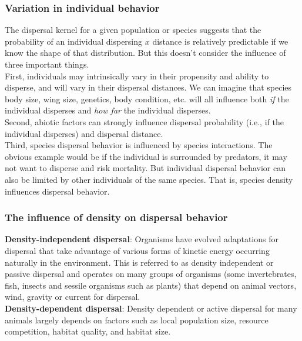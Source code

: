 \documentclass[12pt]{article}
\begin{document}
\subsubsection*{Variation in individual behavior}

The dispersal kernel for a given population or species suggests that the probability of an individual dispersing $x$ distance is relatively predictable if we know the shape of that distribution. But this doesn't consider the influence of three important things.\\

First, individuals may intrinsically vary in their propensity and ability to disperse, and will vary in their dispersal distances. We can imagine that species body size, wing size, genetics, body condition, etc. will all influence both \textit{if} the individual disperses and \textit{how far} the individual disperses. \\

Second, abiotic factors can strongly influence dispersal probability (i.e., if the individual disperses) and dispersal distance. \\

Third, species dispersal behavior is influenced by species interactions. The obvious example would be if the individual is surrounded by predators, it may not want to disperse and risk mortality. But individual dispersal behavior can also be limited by other individuals of the same species. That is, species density influences dispersal behavior.\\










\subsubsection*{The influence of density on dispersal behavior}

\textbf{Density-independent dispersal}: Organisms have evolved adaptations for dispersal that take advantage of various forms of kinetic energy occurring naturally in the environment. This is referred to as density independent or passive dispersal and operates on many groups of organisms (some invertebrates, fish, insects and sessile organisms such as plants) that depend on animal vectors, wind, gravity or current for dispersal.\\

\textbf{Density-dependent dispersal}: Density dependent or active dispersal for many animals largely depends on factors such as local population size, resource competition, habitat quality, and habitat size.\\
\end{document}
